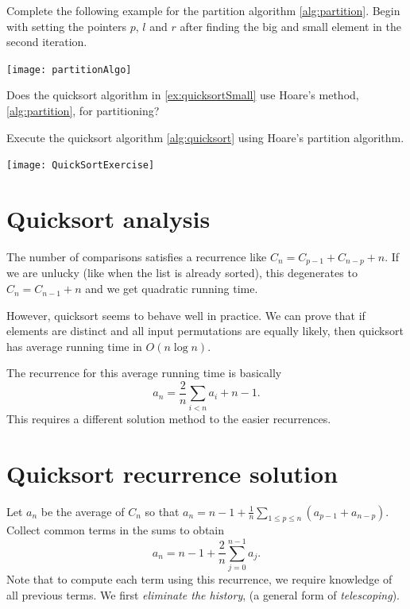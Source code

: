 \begin{Boxample}[0]
Complete the following example for the partition algorithm \cref{alg:partition}. 
Begin with setting the pointers $p$, $l$ and $r$ after finding the big and small element in the second iteration.
\begin{center}
\texttt{[image: partitionAlgo]}
\end{center}
\end{Boxample}

\begin{Boxample}[1]
Does the quicksort algorithm in \cref{ex:quicksortSmall} use Hoare's method, \cref{alg:partition}, for partitioning? 
\end{Boxample}


\begin{Boxample}[2]
Execute the quicksort algorithm \cref{alg:quicksort} using Hoare's partition algorithm.
\begin{center}
\texttt{[image: QuickSortExercise]}
\end{center}
\end{Boxample}

\section{Quicksort analysis}
The number of comparisons satisfies a recurrence like 
$C_n = C_{p-1} + C_{n - p} + n$. If we are unlucky (like when the list is already sorted), this degenerates to 
$C_{n} = C_{n-1} + n$ and we get quadratic running time.

However, quicksort seems to behave well in practice. We can prove that 
if elements are distinct and all input permutations are equally likely, then 
quicksort has average running time in $O(n \log n)$.

The recurrence for this average running time is basically
$$ a_n = \frac{2}{n} \sum_{i<n} a_i + n-1. $$ 
This requires a different solution method to the easier recurrences.

\section{Quicksort recurrence solution}
Let $a_n$ be the average of $C_n$ so that 
$a_n = n - 1 + \frac{1}{n} \sum_{1\leq p \leq n} (a_{p-1} + a_{n-p})$. 
Collect common terms in the sums to obtain
$$a_n = n - 1 + \frac{2}{n} \sum_{j=0}^{n-1} a_j.$$ 
Note that to compute each term using this recurrence, we require knowledge of all previous terms.
We first \emph{eliminate the history}, (a general form of \emph{telescoping}). 

